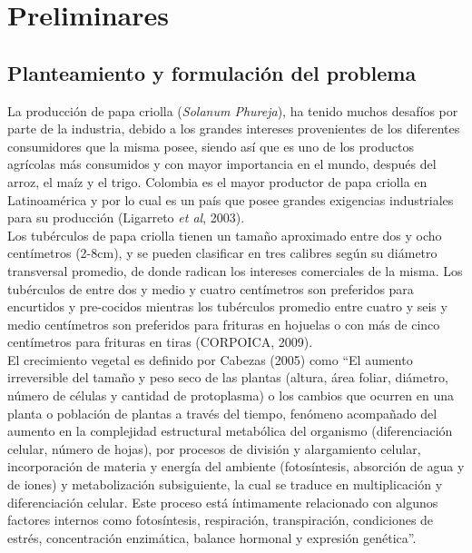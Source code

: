 \chapter{Preliminares}

\section{Planteamiento y formulación del problema}

La producción de papa criolla (\textit{Solanum Phureja}), ha tenido muchos desafíos por parte de la industria, debido a los grandes intereses provenientes de los diferentes consumidores que la misma posee, siendo así que es uno de los productos agrícolas más consumidos y con mayor importancia en el mundo, después del arroz, el maíz y el trigo. Colombia es el mayor productor de papa criolla en Latinoamérica y por lo cual es un país que posee grandes exigencias industriales para su producción (Ligarreto \textit{et al}, 2003).\\

Los tubérculos de papa criolla tienen un tamaño aproximado entre dos y ocho centímetros (2-8cm), y se pueden clasificar en tres calibres según su diámetro transversal promedio,  de donde radican los intereses comerciales de la misma. Los tubérculos de entre dos y medio y cuatro centímetros son preferidos para encurtidos y pre-cocidos mientras los tubérculos promedio entre cuatro y seis y medio centímetros son preferidos para frituras en hojuelas o con más de cinco centímetros para frituras en tiras (CORPOICA, 2009).\\

El crecimiento vegetal es definido por Cabezas (2005) como "`El aumento irreversible del tamaño y peso seco de las plantas (altura, área foliar, diámetro, número de células y cantidad de protoplasma) o los cambios que ocurren en una planta o población de plantas a través del tiempo, fenómeno acompañado del aumento en la complejidad estructural metabólica del organismo (diferenciación celular, número de hojas), por procesos de división y alargamiento celular, incorporación de materia y energía del ambiente (fotosíntesis, absorción de agua y de iones) y metabolización subsiguiente, la cual se traduce en multiplicación y diferenciación celular. Este proceso está íntimamente relacionado con algunos factores internos como fotosíntesis, respiración, transpiración, condiciones de estrés, concentración enzimática, balance hormonal y expresión genética"'.\\

